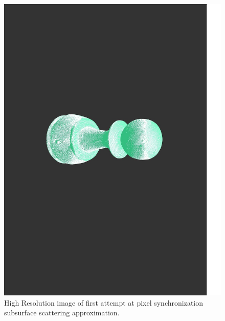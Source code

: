 \documentclass[a4paper, 12pt]{article}
\begin{document}
\begin{figure}[htb!]
	\centering
	\includegraphics[width=1.0\textwidth]{pBadRenderSideways.jpg}
	\caption{High Resolution image of first attempt at pixel synchronization subsurface scattering approximation.}
	\label{pic:bigBadRender}
\end{figure}
\end{document}
